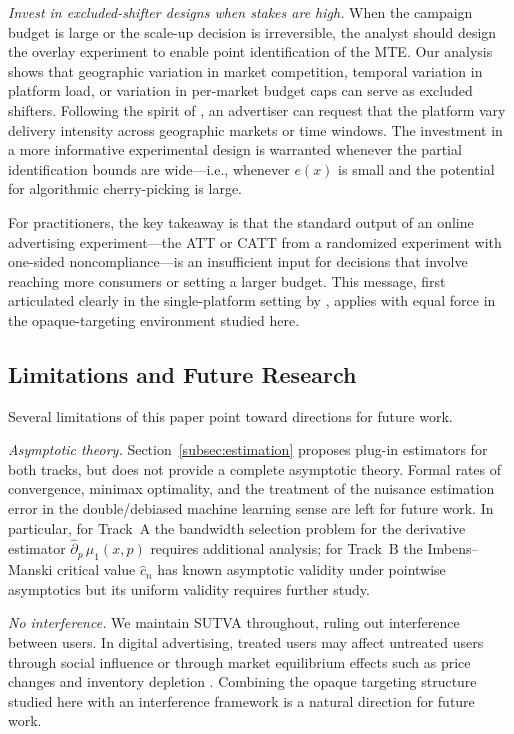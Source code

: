 \documentclass[11pt]{article}
\begin{document}
\emph{Invest in excluded-shifter designs when stakes are high.}  When the
campaign budget is large or the scale-up decision is irreversible, the analyst
should design the overlay experiment to enable point identification of the MTE.
Our analysis shows that geographic variation in market competition, temporal
variation in platform load, or variation in per-market budget caps can serve as
excluded shifters.  Following the spirit of \citet{waisman2025multicell}, an
advertiser can request that the platform vary delivery intensity across geographic
markets or time windows.  The investment in a more informative experimental
design is warranted whenever the partial identification bounds are wide---i.e.,
whenever $e(x)$ is small and the potential for algorithmic cherry-picking is
large.

For practitioners, the key takeaway is that the standard output of an online
advertising experiment---the ATT or CATT from a randomized experiment with
one-sided noncompliance---is an insufficient input for decisions that involve
reaching more consumers or setting a larger budget.  This message, first
articulated clearly in the single-platform setting by \citet{waisman2025multicell},
applies with equal force in the opaque-targeting environment studied here.

\subsection{Limitations and Future Research}
\label{subsec:limitations}

Several limitations of this paper point toward directions for future work.

\emph{Asymptotic theory.}  Section~\ref{subsec:estimation} proposes plug-in
estimators for both tracks, but does not provide a complete asymptotic theory.
Formal rates of convergence, minimax optimality, and the treatment of the
nuisance estimation error in the double/debiased machine learning sense
\citep{chernozhukov2018double} are left for future work.  In particular, for
Track~A the bandwidth selection problem for the derivative estimator
$\hat{\partial}_p\,\mu_1(x,p)$ requires additional analysis; for Track~B the
Imbens--Manski critical value $\hat{c}_n$ has known asymptotic validity under
pointwise asymptotics but its uniform validity requires further study.

\emph{No interference.}  We maintain SUTVA throughout, ruling out interference
between users.  In digital advertising, treated users may affect untreated users
through social influence or through market equilibrium effects such as price
changes and inventory depletion \citep{johari2022experimental}.  Combining the
opaque targeting structure studied here with an interference framework is a
natural direction for future work.
\end{document}
